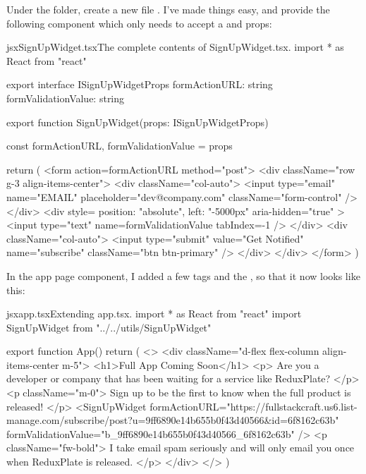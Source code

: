 \documentclass[a4paper,headinclude=on,footinclude=on,12pt,oneside]{scrbook}
\begin{document}

Under the  folder, create a new file . 
I've made things easy, and provide the following component which only needs to accept a  and  props:

\begin{codeInput}{jsx}{SignUpWidget.tsx}{The complete contents of SignUpWidget.tsx.}
import * as React from "react"

export interface ISignUpWidgetProps {
  formActionURL: string
  formValidationValue: string
}

export function SignUpWidget(props: ISignUpWidgetProps) {
  const { formActionURL, formValidationValue } = props

  return (
    <form action={formActionURL} method="post">
      <div className="row g-3 align-items-center">
        <div className="col-auto">
          <input
            type="email"
            name="EMAIL"
            placeholder="dev@company.com"
            className="form-control"
          />
        </div>
        <div
          style={{ position: "absolute", left: "-5000px" }}
          aria-hidden="true"
        >
          <input type="text" name={formValidationValue} tabIndex={-1} />
        </div>
        <div className="col-auto">
          <input
            type="submit"
            value="Get Notified"
            name="subscribe"
            className="btn btn-primary"
          />
        </div>
      </div>
    </form>
  )
}  
\end{codeInput}


In the app page component, I added a few  tags and the , so that it now looks like this:

\begin{codeInput}{jsx}{app.tsx}{Extending app.tsx.}
import * as React from "react"
import { SignUpWidget } from "../../utils/SignUpWidget"

export function App() {
  return (
    <>
      <div className="d-flex flex-column align-items-center m-5">
        <h1>Full App Coming Soon</h1>
        <p>
          Are you a developer or company that has been waiting for a service
          like ReduxPlate?
        </p>
        <p className="m-0">
          Sign up to be the first to know when the full product is released!
        </p>
        <SignUpWidget
          formActionURL="https://fullstackcraft.us6.list-manage.com/subscribe/post?u=9ff6890e14b655b0f43d40566&id=6f8162c63b"
          formValidationValue="b_9ff6890e14b655b0f43d40566_6f8162c63b"
        />
        <p className="fw-bold">
          I take email spam seriously and will only email you once when ReduxPlate is released.
        </p>
      </div>
    </>
  )
}  
\end{codeInput}
\end{document}
